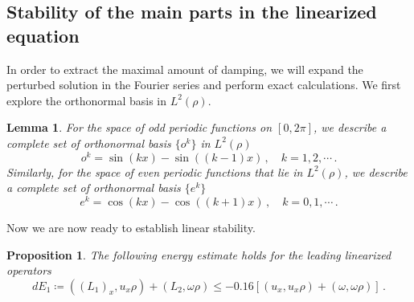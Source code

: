 \documentclass[12pt]{caltech_thesis}
\newtheorem{lemma}[theorem]{Lemma}
\newtheorem{proposition}[theorem]{Proposition}
\numberwithin{equation}{section}
\begin{document}
\subsection{Stability of the main parts in the linearized equation}
 \label{stab main}

In order to extract the maximal amount of damping, we will expand the perturbed solution in the Fourier series and perform exact calculations. We first explore the orthonormal basis in $L^2(\rho)$.
\begin{lemma}
For the space of odd periodic functions on $[0,2\pi]$, we describe a complete set of orthonormal basis $\{o^k\}$ in $L^2(\rho)$  $$o^k=\sin(kx)-\sin((k-1)x)\,,\quad k=1,2,\cdots\,.$$
Similarly, for the space of even periodic functions that lie in $L^2(\rho)$, we describe a complete set of orthonormal basis $\{e^k\}$
$$e^k=\cos(kx)-\cos((k+1)x)\,,\quad k=0,1,\cdots\,.$$
\end{lemma}
Now we are now ready to establish linear stability. 
\begin{proposition}\label{prop d} The following energy estimate holds for the leading linearized operators
$$dE_1\coloneqq((L_1)_x,u_x\rho)+(L_2,\omega\rho)\leq -0.16[(u_x,u_x\rho)+(\omega,\omega\rho)]\,.$$
\end{proposition}
\end{document}
